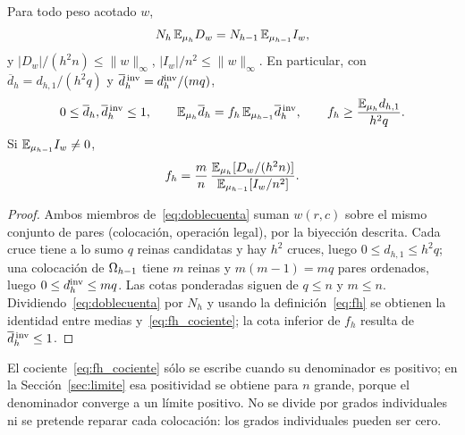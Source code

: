 \begin{lema}\label{lem:doblecuenta}
Para todo peso acotado $w$,
\begin{equation}\label{eq:doblecuenta}
 N_h\,\mathbb{E}_{\mu_h}D_w=N_{h-1}\,\mathbb{E}_{\mu_{h-1}}I_w ,
\end{equation}
y $|D_w|/(h^2n)\le\|w\|_\infty$, $|I_w|/n^2\le\|w\|_\infty$. En particular, con
$\overline d_h=d_{h,1}/(h^2q)$ y $\overline d{}^{\,\mathrm{inv}}_h=d_h^{\mathrm{inv}}/(mq)$,
\[
 0\le\overline d_h,\overline d{}^{\,\mathrm{inv}}_h\le1,\qquad
 \mathbb{E}_{\mu_h}\overline d_h=f_h\,\mathbb{E}_{\mu_{h-1}}\overline d{}^{\,\mathrm{inv}}_h,\qquad
 f_h\ge\frac{\mathbb{E}_{\mu_h}d_{h,1}}{h^2q}.
\]
Si $\mathbb{E}_{\mu_{h-1}}I_w\ne0$,
\begin{equation}\label{eq:fh_cociente}
 f_h=\frac mn\,\frac{\mathbb{E}_{\mu_h}[D_w/(h^2n)]}{\mathbb{E}_{\mu_{h-1}}[I_w/n^2]} .
\end{equation}
\end{lema}

\begin{proof}
Ambos miembros de~\eqref{eq:doblecuenta} suman $w(r,c)$ sobre el mismo conjunto de pares
(colocación, operación legal), por la biyección descrita. Cada cruce tiene a lo sumo $q$
reinas candidatas y hay $h^2$ cruces, luego $0\le d_{h,1}\le h^2q$; una colocación de
$\Omega_{h-1}$ tiene $m$ reinas y $m(m-1)=mq$ pares ordenados, luego $0\le d_h^{\mathrm{inv}}\le mq$. Las cotas
ponderadas siguen de $q\le n$ y $m\le n$. Dividiendo~\eqref{eq:doblecuenta} por $N_h$ y usando la
definición~\eqref{eq:fh} se obtienen la identidad entre medias y~\eqref{eq:fh_cociente}; la cota
inferior de $f_h$ resulta de $\overline d{}^{\,\mathrm{inv}}_h\le1$.
\end{proof}

El cociente~\eqref{eq:fh_cociente} sólo se escribe cuando su denominador es positivo; en la
Sección~\ref{sec:limite} esa positividad se obtiene para $n$ grande, porque el denominador
converge a un límite positivo. No se divide por grados individuales ni se pretende reparar cada
colocación: los grados individuales pueden ser cero.
